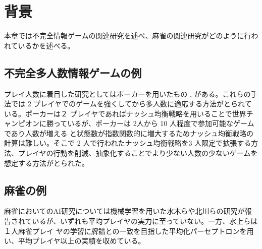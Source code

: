 \chapter{背景}
\label{chap:relevantstudy}

本章では不完全情報ゲームの関連研究を述べ、麻雀の関連研究がどのように行われているかを述べる。






\section{不完全多人数情報ゲームの例}
プレイ人数に着目した研究としてはポーカーを用いたもの \cite{poker},\cite{hurui} がある。これらの手法では 2 プレイヤでのゲームを強くしてから多人数に適応する方法がとられている。ポーカーは２ プレイヤであればナッシュ均衡戦略を用いることで世界チャンピオンに勝っているが、ポーカーは 2人から 10 人程度で参加可能なゲームであり人数が増える
と状態数が指数関数的に増大するためナッシュ均衡戦略の計算は難しい。そこで 2 人で行われたナッシュ均衡戦略を3 人限定で拡張する方法、プレイヤの行動を削減、抽象化することでより少ない人数の少ないゲームを想定する方法がとられた。

\section{麻雀の例}

麻雀においてのAI研究については機械学習を用いた水木ら\cite{miki}や北川ら\cite{kitakawa}の研究が報告されているが、いずれも平均プレイヤの実力に至っていない。一方、水上ら\cite{bakuuti}は１人麻雀プレイ ヤの学習に牌譜との一致を目指した平均化パーセプトロンを用い、平均プレイヤ以上の実績を収めている。

